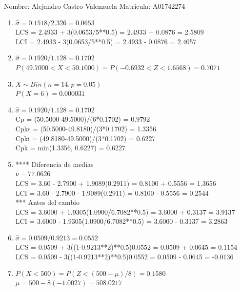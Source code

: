 \documentclass[8pt]{report}
\begin{document}
 \newpage

Nombre: \underline{\hspace*{.2in}}
Alejandro Castro Valenzuela
\underline{\hspace*{.2in}} \quad Matr\'icula:\underline{\hspace*{.2in}}
A01742274
\underline{\hspace*{.2in}} \\

\begin{enumerate}
\item $\hat\sigma = 0.1518/2.326 = 0.0653$\\
LCS = 2.4933 + 3(0.0653/5**0.5) = 2.4933 + 0.0876 = 2.5809\\
LCI = 2.4933 - 3(0.0653/5**0.5) = 2.4933 - 0.0876 = 2.4057
\item $\hat\sigma = 0.1920/1.128 = 0.1702$\\
$P(49.7000 < X < 50.1000) = P(-0.6932 < Z < 1.6568) = 0.7071$\\
\item $X \sim Bin(n=14, p=0.05)$\\
$P(X = 6) = 0.000031$
\item $\hat\sigma = 0.1920/1.128 = 0.1702$\\
Cp = (50.5000-49.5000)/(6*0.1702) = 0.9792\\
Cpks = (50.5000-49.8180)/(3*0.1702) = 1.3356\\
Cpki = (49.8180-49.5000)/(3*0.1702) = 0.6227\\
Cpk = min(1.3356, 0.6227) = 0.6227
\item **** Diferencia de medias\\
$\nu = 77.0626$\\
LCS = 3.60 - 2.7900 + 1.9089(0.2911) = 0.8100 + 0.5556 = 1.3656\\
LCI = 3.60 - 2.7900 - 1.9089(0.2911) = 0.8100 - 0.5556 = 0.2544\\
*** Antes del cambio\\
LCS = 3.6000 + 1.9305(1.0900/6.7082**0.5) = 3.6000 + 0.3137 = 3.9137\\
LCI = 3.6000 - 1.9305(1.0900/6.7082**0.5) = 3.6000 - 0.3137 = 3.2863\\
\item $\hat\sigma = 0.0509/0.9213 = 0.0552$\\
LCS = 0.0509 + 3((1-0.9213**2)**0.5)0.0552 = 0.0509 + 0.0645 = 0.1154\\
LCS = 0.0509 - 3((1-0.9213**2)**0.5)0.0552 = 0.0509 - 0.0645 = -0.0136
\item $P(X < 500) = P(Z < (500-\mu)/8) = 0.1580$\\
$\mu = 500 - 8(-1.0027) = 508.0217$\\
\end{enumerate}
\end{document}
